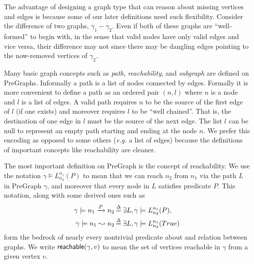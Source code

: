 The advantage of designing a graph type that can reason about missing vertices and edges is because some of our later definitions need such flexibility. {\color{magenta} Consider the difference of two graphs, $\gamma_1 - \gamma_2$.  Even if both of these graphs are ``well-formed'' to begin with, in the sense that valid nodes have only valid edges and vice versa, their difference may not since there may be dangling edges pointing to the now-removed vertices of $\gamma_2$.}

{\color{magenta}
Many basic graph concepts such as \emph{path}, \emph{reachability}, and \emph{subgraph} are defined on PreGraphs.
Informally a path is a list of nodes connected by edges.  Formally it is more convenient to
define a path as an ordered pair $(n,l)$ where $n$ is a node and $l$ is a list of edges.
A valid path requires $n$ to be the source of the first edge of $l$ (if one exists) and moreover
requires $l$ to be ``well chained''.  That is, the destination of one edge in $l$ must be the 
source of the next edge.  The list $l$ can be null to represent an empty path starting and ending
at the node $n$.  We prefer this encoding as opposed to some others (\emph{e.g.} a list of edges)
because the definitions of important concepts like reachability are cleaner.
}

The most important definition on PreGraph is the concept of reachability.
We use the notation $\gamma \models L_{n_2}^{n_1}(P)$ to mean that we can reach $n_2$ from $n_1$ via the path $L$ in PreGraph $\gamma$, and moreover that every node in $L$ satisfies predicate $P$.  This notation, along
with some derived ones such as
\begin{equation*}
\begin{split}
\gamma\models n_1 \xrightarrow{P} n_2 &\mathbin{\stackrel{\Delta}{=}} \exists L, \gamma \models L_{n_2}^{n_1}(P),\\
\gamma\models n_1 \leadsto n_2 &\mathbin{\stackrel{\Delta}{=}} \exists L, \gamma \models L_{n_2}^{n_1}(True)
\end{split}
\end{equation*}
form the bedrock of nearly every nontrivial predicate about and relation between
graphs.
We write $\mathsf{reachable}(\gamma,v)$ to mean the set of vertices reachable in $\gamma$ from a given vertex $v$.

